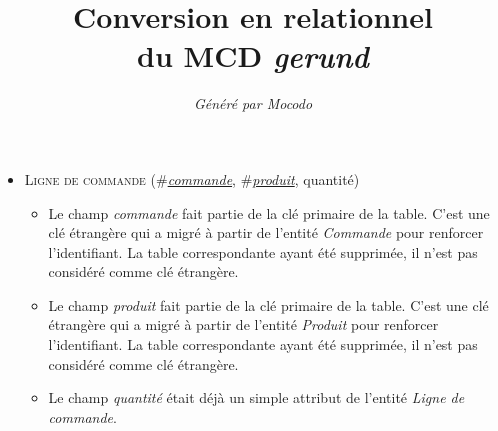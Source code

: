 \documentclass[a4paper]{article}
\title{Conversion en relationnel\\du MCD \emph{gerund}}
\author{\emph{Généré par Mocodo}}
\newcommand{\relat}[1]{\textsc{#1}}
\newcommand{\attr}[1]{#1}
\newcommand{\prim}[1]{\uline{#1}}
\newcommand{\foreign}[1]{\#\textsl{#1}}
\begin{document}
\maketitle

\begin{itemize}
  \item \relat{Ligne de commande} (\foreign{\prim{commande}}, \foreign{\prim{produit}}, \attr{quantité})
  \begin{itemize}
    \item Le champ \emph{commande} fait partie de la clé primaire de la table. C'est une clé étrangère qui a migré à partir de l'entité \emph{Commande} pour renforcer l'identifiant. La table correspondante ayant été supprimée, il n'est pas considéré comme clé étrangère.
    \item Le champ \emph{produit} fait partie de la clé primaire de la table. C'est une clé étrangère qui a migré à partir de l'entité \emph{Produit} pour renforcer l'identifiant. La table correspondante ayant été supprimée, il n'est pas considéré comme clé étrangère.
    \item Le champ \emph{quantité} était déjà un simple attribut de l'entité \emph{Ligne de commande}.
  \end{itemize}

\end{itemize}
\end{document}
